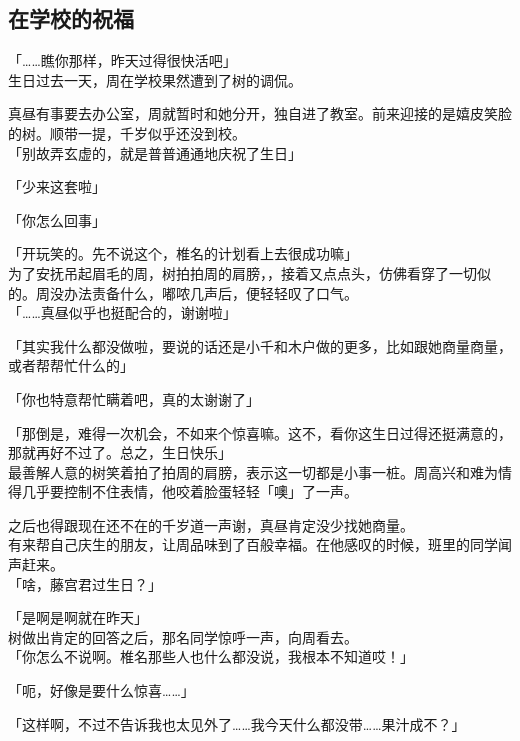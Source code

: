 \subsection{在学校的祝福}

「……瞧你那样，昨天过得很快活吧」\\

生日过去一天，周在学校果然遭到了树的调侃。

真昼有事要去办公室，周就暂时和她分开，独自进了教室。前来迎接的是嬉皮笑脸的树。顺带一提，千岁似乎还没到校。\\

「别故弄玄虚的，就是普普通通地庆祝了生日」

「少来这套啦」

「你怎么回事」

「开玩笑的。先不说这个，椎名的计划看上去很成功嘛」\\

为了安抚吊起眉毛的周，树拍拍周的肩膀，，接着又点点头，仿佛看穿了一切似的。周没办法责备什么，嘟哝几声后，便轻轻叹了口气。\\

「……真昼似乎也挺配合的，谢谢啦」

「其实我什么都没做啦，要说的话还是小千和木户做的更多，比如跟她商量商量，或者帮帮忙什么的」

「你也特意帮忙瞒着吧，真的太谢谢了」

「那倒是，难得一次机会，不如来个惊喜嘛。这不，看你这生日过得还挺满意的，那就再好不过了。总之，生日快乐」\\

最善解人意的树笑着拍了拍周的肩膀，表示这一切都是小事一桩。周高兴和难为情得几乎要控制不住表情，他咬着脸蛋轻轻「噢」了一声。

之后也得跟现在还不在的千岁道一声谢，真昼肯定没少找她商量。\\

有来帮自己庆生的朋友，让周品味到了百般幸福。在他感叹的时候，班里的同学闻声赶来。\\

「啥，藤宫君过生日？」

「是啊是啊就在昨天」\\

树做出肯定的回答之后，那名同学惊呼一声，向周看去。\\

「你怎么不说啊。椎名那些人也什么都没说，我根本不知道哎！」

「呃，好像是要什么惊喜……」

「这样啊，不过不告诉我也太见外了……我今天什么都没带……果汁成不？」

